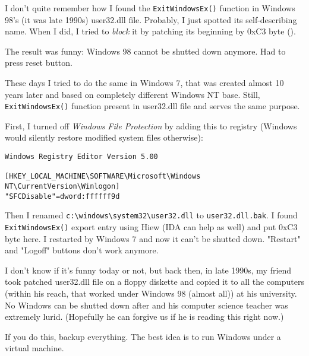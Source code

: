 
I don't quite remember how I found the \verb|ExitWindowsEx()| function in Windows 98's (it was late 1990s) user32.dll file.
Probably, I just spotted its self-describing name.
When I did, I tried to \emph{block} it by patching its beginning by 0xC3 byte ().

The result was funny: Windows 98 cannot be shutted down anymore.
Had to press reset button.

These days I tried to do the same in Windows 7, that was created almost 10 years later and based on completely different Windows NT
base.
Still, \verb|ExitWindowsEx()| function present in user32.dll file and serves the same purpose.

First, I turned off \emph{Windows File Protection} by adding this to registry
(Windows would silently restore modified system files otherwise):

\begin{lstlisting}
Windows Registry Editor Version 5.00

[HKEY_LOCAL_MACHINE\SOFTWARE\Microsoft\Windows NT\CurrentVersion\Winlogon]
"SFCDisable"=dword:ffffff9d
\end{lstlisting}

Then I renamed \verb|c:\windows\system32\user32.dll| to \verb|user32.dll.bak|.
I found \verb|ExitWindowsEx()| export entry using Hiew (IDA can help as well) and put 0xC3 byte here.
I restarted by Windows 7 and now it can't be shutted down.
"Restart" and "Logoff" buttons don't work anymore.

I don't know if it's funny today or not, but back then, in late 1990s, my friend took patched user32.dll file
on a floppy diskette and copied it to all the computers
(within his reach, that worked under Windows 98 (almost all))
at his university.
No Windows can be shutted down after and his computer science teacher was extremely lurid.
(Hopefully he can forgive us if he is reading this right now.)

If you do this, backup everything.
The best idea is to run Windows under a virtual machine.

